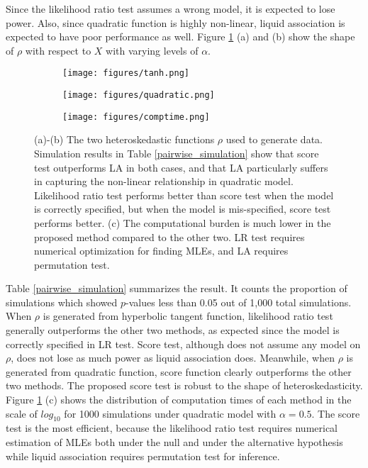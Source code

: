 \documentclass[aoas,preprint]{imsart}
\numberwithin{equation}{section}
\theoremstyle{plain}
\begin{document}
Since the likelihood ratio test assumes a wrong model, it is expected to lose power. Also, since quadratic function is highly non-linear, liquid association is expected to have poor performance as well. Figure \ref{fig:sim} (a) and (b) show the shape of $\rho$ with respect to $X$ with varying levels of $\alpha$. \\
\begin{figure}
     \begin{subfigure}[b]{0.3\textwidth}
         \texttt{[image: figures/tanh.png]}
         \caption{}
     \end{subfigure}
     \begin{subfigure}[b]{0.3\textwidth}
         \texttt{[image: figures/quadratic.png]}
         \caption{}
     \end{subfigure}
     \begin{subfigure}[b]{0.3\textwidth}
         \texttt{[image: figures/comptime.png]}
         \caption{}
     \end{subfigure}
        \caption{\label{fig:sim} (a)-(b) The two heteroskedastic functions $\rho$ used to generate data. Simulation results in Table \ref{pairwise_simulation} show that score test outperforms LA in both cases, and that LA particularly suffers in capturing the non-linear relationship in quadratic model. Likelihood ratio test performs better than score test when the model is correctly specified, but when the model is mis-specified, score test performs better. (c) The computational burden is much lower in the proposed method compared to the other two. LR test requires numerical optimization for finding MLEs, and LA requires permutation test.}
\end{figure}

 Table \ref{pairwise_simulation} summarizes the result. It counts the proportion of simulations which showed $p$-values less than 0.05 out of 1,000 total simulations. When $\rho$ is generated from hyperbolic tangent function, likelihood ratio test generally outperforms the other two methods, as expected since the model is correctly specified in LR test. Score test, although does not assume any model on $\rho$, does not lose as much power as liquid association does. Meanwhile, when $\rho$ is generated from quadratic function, score function clearly outperforms the other two methods. The proposed score test is robust to the shape of heteroskedasticity. Figure \ref{fig:sim} (c) shows the distribution of computation times of each method in the scale of $log_{10}$ for 1000 simulations under quadratic model with $\alpha = 0.5$. The score test is the most efficient, because the likelihood ratio test requires numerical estimation of MLEs both under the null and under the alternative hypothesis while liquid association requires permutation test for inference. 
\end{document}

